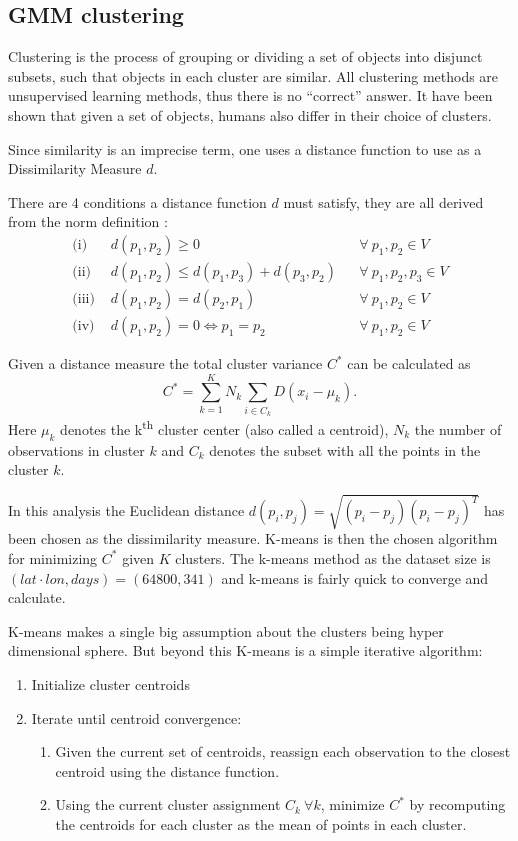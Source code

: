 \subsection{GMM clustering}

Clustering is the process of grouping or dividing a set of objects into disjunct subsets, such that objects in each cluster are similar.
All clustering methods are unsupervised learning methods, thus there is no ``correct'' answer.
It have been shown that given a set of objects, humans also differ in their choice of clusters.

Since similarity is an imprecise term, one uses a distance function to use as a Dissimilarity Measure $d$.

There are 4 conditions a distance function $d$ must satisfy, they are all derived from the norm definition \cite[p.~30]{math-4}:
\begin{align}
\text{(i) }   & d(p_1,p_2) \ge 0 && \forall \ p_1, p_2 \in V \\
\text{(ii) }  & d(p_1,p_2) \le d(p_1, p_3) + d(p_3, p_2) && \forall \ p_1, p_2, p_3 \in V \\
\text{(iii) } & d(p_1, p_2) = d(p_2, p_1) && \forall \ p_1, p_2 \in V \\
\text{(iv) } & d(p_1, p_2) = 0 \Leftrightarrow p_1 = p_2 && \forall \ p_1, p_2 \in V
\end{align}

Given a distance measure the total cluster variance $C^{*}$ can be calculated as
\begin{equation}
C^{*}=\sum^K_{k=1} N_k \sum_{i \in C_k} D(x_i-\mu_k).
\end{equation}
Here $\mu_k$ denotes the k\textsuperscript{th} cluster center (also called a centroid), $N_k$ the number of observations in cluster $k$ and $C_k$ denotes the subset with all the points in the cluster $k$.

In this analysis the Euclidean distance $d(p_i, p_j)= \sqrt{(p_i-p_j)(p_i-p_j)^{T}}$ has been chosen as the dissimilarity measure.
K-means is then the chosen algorithm for minimizing $C^{*}$ given $K$ clusters.
The k-means method as the dataset size is $(lat \cdot lon, days) = (64800,341)$ and k-means is fairly quick to converge and calculate.

K-means makes a single big assumption about the clusters being hyper dimensional sphere. But beyond this K-means is a simple iterative algorithm:
\begin{enumerate}
	\item Initialize cluster centroids
	\item Iterate until centroid convergence:
	\begin{enumerate}
		\item Given the current set of centroids, reassign each observation to the closest centroid using the distance function.
		\item Using the current cluster assignment $C_k\ \forall k$, minimize $C^{*}$ by recomputing the centroids for each cluster as the mean of points in each cluster.
	\end{enumerate}
\end{enumerate}

